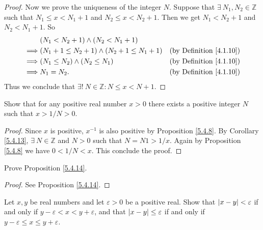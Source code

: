 \begin{proof}
Now we prove the uniqueness of the integer \(N\).
Suppose that \(\exists\ N_1, N_2 \in \mathds{Z}\) such that \(N_1 \leq x < N_1 + 1\) and \(N_2 \leq x < N_2 + 1\).
Then we get \(N_1 < N_2 + 1\) and \(N_2 < N_1 + 1\).
So
\begin{align*}
& (N_1 < N_2 + 1) \land (N_2 < N_1 + 1) \\
\implies & (N_1 + 1 \leq N_2 + 1) \land (N_2 + 1 \leq N_1 + 1) & \text{(by Definition \ref{4.1.10})} \\
\implies & (N_1 \leq N_2) \land (N_2 \leq N_1) & \text{(by Definition \ref{4.1.10})} \\
\implies & N_1 = N_2. & \text{(by Definition \ref{4.1.10})}
\end{align*}
Thus we conclude that \(\exists!\ N \in \mathds{Z} : N \leq x < N + 1\).
\end{proof}

\begin{exercise}\label{ex 5.4.4}
Show that for any positive real number \(x > 0\) there exists a positive integer \(N\) such that \(x > 1 / N > 0\).
\end{exercise}

\begin{proof}
Since \(x\) is positive, \(x^{-1}\) is also positive by Proposition \ref{5.4.8}.
By Corollary \ref{5.4.13}, \(\exists\ N \in \mathds{Z}\) and \(N > 0\) such that \(N = N1 > 1 / x\).
Again by Proposition \ref{5.4.8} we have \(0 < 1 / N < x\).
This conclude the proof.
\end{proof}

\begin{exercise}\label{ex 5.4.5}
Prove Proposition \ref{5.4.14}.
\end{exercise}

\begin{proof}
See Proposition \ref{5.4.14}.
\end{proof}

\begin{exercise}\label{ex 5.4.6}
Let \(x, y\) be real numbers and let \(\varepsilon > 0\) be a positive real.
Show that \(\abs*{x - y} < \varepsilon\) if and only if \(y - \varepsilon < x < y + \varepsilon\), and that \(\abs*{x - y} \leq \varepsilon\) if and only if \(y - \varepsilon \leq x \leq y + \varepsilon\).
\end{exercise}

